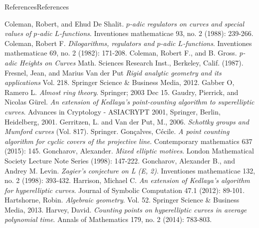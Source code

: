 \documentclass[10pt,]{book}
\numberwithin{equation}{section}
\begin{document}
\begin{references-chapter-numberless}{References}{}{References}{}{}
\begin{thebibliography}{9}
\hypertarget{bib-coleman-de-shalit}{}Coleman, Robert, and Ehud De Shalit. \textit{\(p\)-adic regulators on curves and special values of \(p\)-adic \(L\)-functions}. Inventiones mathematicae 93, no. 2 (1988): 239-266.
\hypertarget{bib-coleman-dilogs}{}Coleman, Robert F. \textit{Dilogarithms, regulators and \(p\)-adic \(L\)-functions}. Inventiones mathematicae 69, no. 2 (1982): 171-208.
\hypertarget{bib-coleman-gross}{}Coleman, Robert F., and B. Gross. \textit{p-adic Heights on Curves} Math. Sciences Research Inst., Berkeley, Calif. (1987).
\hypertarget{bib-fresnel-van-der-put}{}Fresnel, Jean, and Marius Van der Put \textit{Rigid analytic geometry and its applications} Vol. 218. Springer Science \& Business Media, 2012.
\hypertarget{bib-gabber-ramero}{}Gabber O, Ramero L. \textit{Almost ring theory}. Springer; 2003 Dec 15.
\hypertarget{bib-gaudry-gurel}{}Gaudry, Pierrick, and Nicolas Gürel. \textit{An extension of Kedlaya's point-counting algorithm to superelliptic curves}. Advances in Cryptology - ASIACRYPT 2001, Springer, Berlin, Heidelberg, 2001.
\hypertarget{bib-gerritzen-van-der-put}{}Gerritzen, L. and Van der Put, M., 2006. \textit{Schottky groups and Mumford curves} (Vol. 817). Springer.
\hypertarget{bib-goncalves}{}Gonçalves, Cécile. \textit{A point counting algorithm for cyclic covers of the projective line}. Contemporary mathematics 637 (2015): 145.
\hypertarget{bib-goncharov-mixed}{}Goncharov, Alexander. \textit{Mixed elliptic motives}. London Mathematical Society Lecture Note Series (1998): 147-222.
\hypertarget{bib-gl}{}Goncharov, Alexander B., and Andrey M. Levin. \textit{Zagier's conjecture on L (E, 2)}. Inventiones mathematicae 132, no. 2 (1998): 393-432.
\hypertarget{bib-harrison-hyperelliptic}{}Harrison, Michael C. \textit{An extension of Kedlaya's algorithm for hyperelliptic curves}. Journal of Symbolic Computation 47.1 (2012): 89-101.
\hypertarget{bib-hartshorne}{}Hartshorne, Robin. \textit{Algebraic geometry}. Vol. 52. Springer Science \& Business Media, 2013.
\hypertarget{bib-harvey-average}{}Harvey, David. \textit{Counting points on hyperelliptic curves in average polynomial time}. Annals of Mathematics 179, no. 2 (2014): 783-803.

\end{thebibliography}
\end{references-chapter-numberless}
\end{document}

